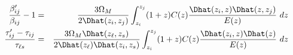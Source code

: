 \begin{eqnarray*}
  \frac{\beta'_{ij}}{\beta_{ij}} - 1 &=&
    \frac{3\Omega_M}{2\Dhat(z_i,z_j)} \int_{z_i}^{z_j} (1+z) C(z) \frac{\Dhat(z_i,z) \Dhat(z,z_j)}{E(z)}\ dz \\
  \frac{\tau'_{i j} - \tau_{i j}}{\tau_{\ell s}} &=&
    \frac{3\Omega_M\Dhat(z_\ell,z_s)}{2\Dhat(z_\ell)\Dhat(z_i,z_s)} \int_{z_i}^{z_j} (1+z) C(z) \frac{\Dhat(z_i,z) \Dhat(z)}{E(z)}\  dz
\end{eqnarray*}